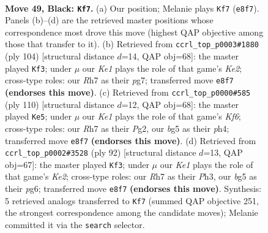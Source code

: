 \documentclass[11pt]{article}
\begin{document}
\clearpage

\begin{figure}[p]\centering
\begin{subfigure}{0.46\textwidth}\centering
\resizebox{\linewidth}{!}{%
\newchessgame
\chessboard[
  setfen={4k1R1/7r/rp6/6B1/1p1P4/3K4/8/8 b - - 2 49},
  showmover=false,
  pgfstyle=straightmove, color=movearrow, markmove={e8-f7}
]}
\caption{}
\end{subfigure}\hfill
\begin{subfigure}{0.46\textwidth}\centering
\resizebox{\linewidth}{!}{%
\newchessgame
\chessboard[
  setfen={7R/6p1/8/3pk3/7P/8/4K1r1/8 w - - 3 53},
  showmover=false,
  pgfstyle=straightmove, color=movearrow, markmove={e2-f3}
]}
\caption{}
\end{subfigure}
\\[4pt]
\begin{subfigure}{0.46\textwidth}\centering
\resizebox{\linewidth}{!}{%
\newchessgame
\chessboard[
  setfen={5k2/R7/5K2/P7/5r1p/8/6P1/8 w - - 8 56},
  showmover=false,
  pgfstyle=straightmove, color=movearrow, markmove={f6-e5}
]}
\caption{}
\end{subfigure}\hfill
\begin{subfigure}{0.46\textwidth}\centering
\resizebox{\linewidth}{!}{%
\newchessgame
\chessboard[
  setfen={8/p6R/3k2p1/8/P7/7P/4K1r1/8 w - - 0 47},
  showmover=false,
  pgfstyle=straightmove, color=movearrow, markmove={e2-f3}
]}
\caption{}
\end{subfigure}
\caption{\textbf{Move 49, Black: \texttt{Kf7}.} (a) Our position; Melanie plays \texttt{Kf7} (\texttt{e8f7}). Panels (b)--(d) are the retrieved master positions whose correspondence most drove this move (highest QAP objective among those that transfer to it). (b) Retrieved from \texttt{ccrl\_top\_p0003\#1880} (ply 104) [structural distance $d$=14, QAP obj=68]: the master played \texttt{Kf3}; under $\mu$ our \emph{Ke1} plays the role of that game's \emph{Ke2}; cross-type roles: our \emph{R}h7 as their \emph{p}g7; transferred move \texttt{e8f7} \textbf{(endorses this move)}. (c) Retrieved from \texttt{ccrl\_top\_p0000\#585} (ply 110) [structural distance $d$=12, QAP obj=68]: the master played \texttt{Ke5}; under $\mu$ our \emph{Ke1} plays the role of that game's \emph{Kf6}; cross-type roles: our \emph{R}h7 as their \emph{P}g2, our \emph{b}g5 as their \emph{p}h4; transferred move \texttt{e8f7} \textbf{(endorses this move)}. (d) Retrieved from \texttt{ccrl\_top\_p0002\#3528} (ply 92) [structural distance $d$=13, QAP obj=67]: the master played \texttt{Kf3}; under $\mu$ our \emph{Ke1} plays the role of that game's \emph{Ke2}; cross-type roles: our \emph{R}h7 as their \emph{P}h3, our \emph{b}g5 as their \emph{p}g6; transferred move \texttt{e8f7} \textbf{(endorses this move)}. Synthesis: 5 retrieved analogs transferred to \texttt{Kf7} (summed QAP objective 251, the strongest correspondence among the candidate moves); Melanie committed it via the \texttt{search} selector.}
\label{fig:thought-m97}
\end{figure}
\end{document}
